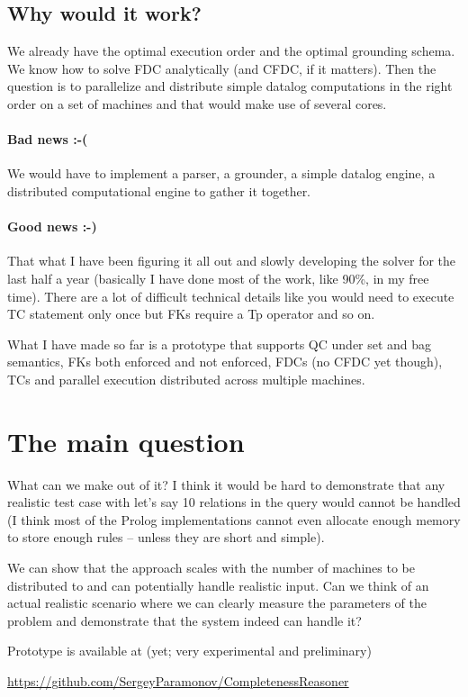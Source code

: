 \documentclass{article}
\begin{document}
\subsection{Why would it work?} We already have the optimal execution order and the optimal grounding schema. We know how to solve FDC analytically (and CFDC, if it matters). Then the question is to parallelize and distribute simple datalog computations in the right order on a set of machines and that would make use of several cores.

\paragraph{Bad news :-( } We would have to implement a parser, a grounder, a simple datalog engine, a distributed computational engine to gather it together.

\paragraph{Good news :-)} That what I have been figuring it all out and slowly developing the solver for the last half a year (basically I have done most of the work, like 90\%, in my free time). There are a lot of difficult technical details like you would need to execute TC statement only once but FKs require a Tp operator and so on.

What I have made so far is a prototype that supports QC under set and bag semantics, FKs both enforced and not enforced, FDCs (no CFDC yet though), TCs and parallel execution distributed across multiple machines.

\section{The main question}
What can we make out of it? I think it would be hard to demonstrate that any realistic test case with let's say 10 relations in the query would cannot be handled (I think most of the Prolog implementations cannot even allocate enough memory to store enough rules -- unless they are short and simple).

We can show that the approach scales with the number of machines to be distributed to and can potentially handle realistic input. Can we think of an actual realistic scenario where we can clearly measure the parameters of the problem and demonstrate that the system indeed can handle it?


Prototype is available at (yet; very experimental and preliminary)
\begin{center}
\url{https://github.com/SergeyParamonov/CompletenessReasoner}
\end{center}
\end{document}
